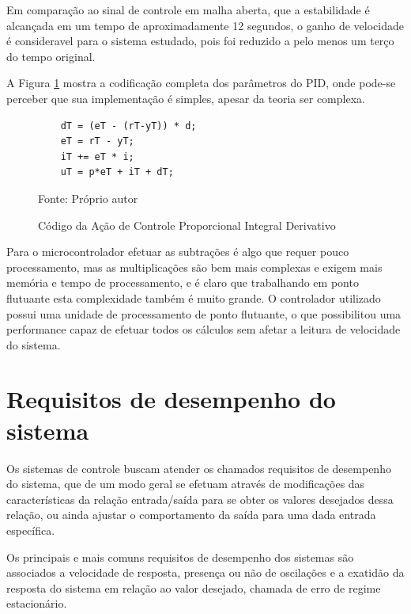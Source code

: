 Em comparação ao sinal de controle em malha aberta, que a estabilidade é alcançada em um tempo de aproximadamente 12 segundos, o ganho de velocidade é consideravel para o sistema estudado, pois foi reduzido a pelo menos um terço do tempo original.

A Figura \ref{fig:codigoControladorPID} mostra a codificação completa dos parâmetros do PID, onde pode-se perceber que sua implementação é simples, apesar da teoria ser complexa. 

\begin{figure}[!htb]
\centering
\caption{Código da Ação de Controle Proporcional Integral Derivativo}
\begin{minipage}{0.8\linewidth}
\lstset{firstnumber=13}
\begin{lstlisting}
    dT = (eT - (rT-yT)) * d;
    eT = rT - yT;
    iT += eT * i; 
    uT = p*eT + iT + dT;
\end{lstlisting}
\end{minipage}
\label{fig:codigoControladorPID}

{\small Fonte: Próprio autor}
\end{figure}


Para o microcontrolador efetuar as subtrações é algo que requer pouco processamento, mas as multiplicações são bem mais complexas e exigem mais memória e tempo de processamento, e é claro que trabalhando em ponto flutuante esta complexidade também é muito grande. O controlador utilizado possui uma unidade de processamento de ponto flutuante, o que possibilitou uma performance capaz de efetuar todos os cálculos sem afetar a leitura de velocidade do sistema.


\section{Requisitos de desempenho do sistema}

Os sistemas de controle buscam atender os chamados requisitos de desempenho do sistema, que de um modo geral se efetuam através de modificações das características da relação entrada/saída para se obter os valores desejados dessa relação, ou ainda ajustar o comportamento da saída para uma dada entrada específica.

Os principais e mais comuns requisitos de desempenho dos sistemas são associados a velocidade de resposta, presença ou não de oscilações e a exatidão da resposta do sistema em relação ao valor desejado, chamada de erro de regime estacionário.

